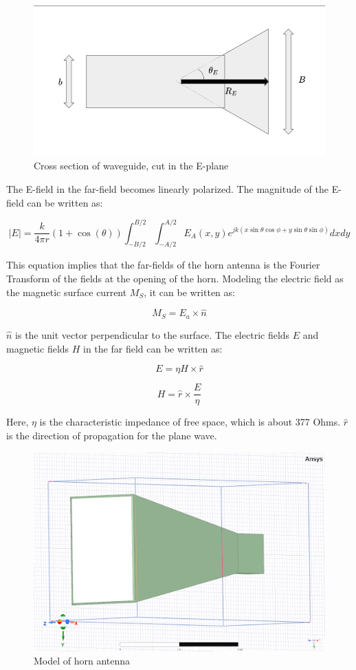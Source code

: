 \documentclass[a4paper,12pt]{report}
\begin{document}
\begin{figure}
  \begin{center}
    \includegraphics[clip, keepaspectratio, width=0.5\linewidth]{img/horn_antenna_e_plane_cross_section.png}
    \caption{Cross section of waveguide, cut in the E-plane}
    \label{fig:horn_antenna_e_plane_cross_section}
  \end{center}
\end{figure}

The E-field in the far-field becomes linearly polarized.
The magnitude of the E-field can be written as:

\begin{equation}
  |E| = \frac{k}{4 \pi r}(1 + \cos(\theta))\int_{-B/2}^{B/2}\int_{-A/2}^{A/2}E_A(x,y)e^{jk(x\sin\theta\cos\phi + y\sin\theta\sin\phi)}dxdy
\end{equation}

This equation implies that the far-fields of the horn antenna
is the Fourier Transform of the fields at the opening of the horn.
Modeling the electric field as the magnetic surface current $M_S$,
it can be written as:

\begin{equation}
  M_S = E_a \times \hat{n}
\end{equation}

$\hat{n}$ is the unit vector perpendicular to the surface.
The electric fields $E$ and magnetic fields $H$ in the far field can be written as:

\begin{equation}
  E = \eta H \times \hat{r}
\end{equation}

\begin{equation}
  H = \hat{r} \times \frac{E}{\eta}
\end{equation}

Here, $\eta$ is the characteristic impedance of free space,
which is about 377 Ohms. $\hat{r}$ is the direction of propagation for the plane wave.

\begin{figure}
  \begin{center}
    \includegraphics[clip, keepaspectratio, width=0.5\linewidth]{img/horn_antenna_model.png}
    \caption{Model of horn antenna}
    \label{fig:model_horn_antenna}
  \end{center}
\end{figure}
\end{document}
